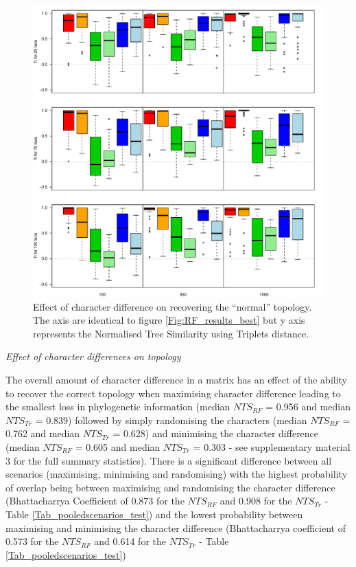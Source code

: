 \documentclass[12pt,letterpaper]{article}
\renewcommand{\subsection}[1]{%
\bigskip
\begin{center}
\begin{large}
\normalfont\itshape #1
\end{large}
\end{center}}
\begin{document}
\begin{figure}[!htbp]
\centering
   \includegraphics[width=1\textwidth]{Figures/Tr_results_best.pdf}
\caption{Effect of character difference on recovering the ``normal'' topology. The axis are identical to figure \ref{Fig:RF_results_best} but y axis represents the Normalised Tree Similarity using Triplets distance.}
\label{Fig:Tr_results_best}
\end{figure}

\subsection{Effect of character differences on topology}

The overall amount of character difference in a matrix has an effect of the ability to recover the correct topology when maximising character difference leading to the smallest loss in phylogenetic information (median $NTS_{RF}$ = 0.956 and median $NTS_{Tr}$ = 0.839) followed by simply randomising the characters (median $NTS_{RF}$ = 0.762 and median $NTS_{Tr}$ = 0.628) and minimising the character difference (median $NTS_{RF}$ = 0.605 and median $NTS_{Tr}$ = 0.303 - see supplementary material 3 for the full summary statistics).
There is a significant difference between all scenarios (maximising, minimising and randomising) with the highest probability of overlap being between maximising and randomising the character difference (Bhattacharrya Coefficient of 0.873 for the $NTS_{RF}$ and 0.908 for the $NTS_{Tr}$ - Table \ref{Tab_pooledscenarios_test}) and the lowest probability between maximising and minimising the character difference (Bhattacharrya coefficient of 0.573 for the $NTS_{RF}$ and 0.614 for the $NTS_{Tr}$ - Table \ref{Tab_pooledscenarios_test})
\end{document}
